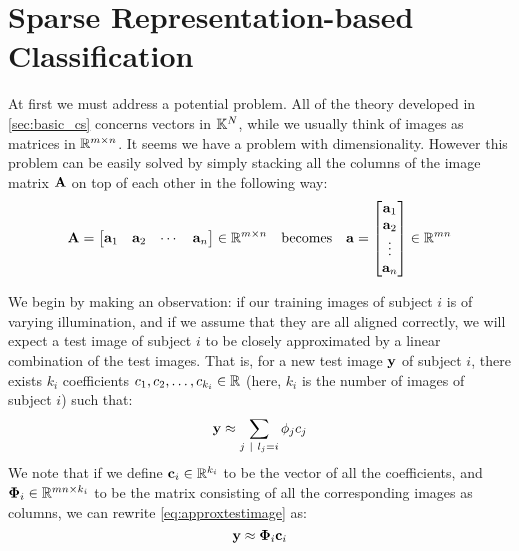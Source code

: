 \section{Sparse Representation-based Classification} \label{sec:src}
At first we must address a potential problem. All of the theory developed in \cref{sec:basic_cs} concerns vectors in $ \mathbb{K}^{N} $, while we usually think of images as matrices in $ \mathbb{R}^{m\times n} $. It seems we have a problem with dimensionality. However this problem can be easily solved by simply stacking all the columns of the image matrix $ \mathbf{A} $ on top of each other in the following way:
\[
	\mathbf{A} = \begin{bmatrix}
		\mathbf{a}_{1} & \mathbf{a}_{2} & \cdots & \mathbf{a}_{n}
	\end{bmatrix} \in \mathbb{R}^{m\times n}
	\quad\text{becomes}\quad 
	\mathbf{a} = \begin{bmatrix}
		\mathbf{a}_{1} \\
		\mathbf{a}_{2} \\
		\vdots \\
		\mathbf{a}_{n}
	\end{bmatrix} \in \mathbb{R}^{mn}
\]

We begin by making an observation: if our training images of subject $ i $ is of varying illumination, and if we assume that they are all aligned correctly, we will expect a test image of subject $ i $ to be closely approximated by a linear combination of the test images. That is, for a new test image $ \mathbf{y} $ of subject $ i $, there exists $ k_{i} $ coefficients $ c_{1}, c_{2}, \ldots, c_{k_{i}}  \in \mathbb{R} $ (here, $ k_{i} $ is the number of images of subject $ i $) such that:
\begin{equation}
	\label{eq:approxtestimage}
	\mathbf{y} \approx \sum_{j ~|~ l_{j} = i} \phi_{j}c_{j}
\end{equation}We note that if we define $ \mathbf{c}_{i} \in \mathbb{R}^{k_{i}} $ to be the vector of all the coefficients, and $ \mathbf{\Phi}_{i} \in \mathbb{R}^{mn \times k_{i}} $ to be the matrix consisting of all the corresponding images as columns, we can rewrite \eqref{eq:approxtestimage} as:
\begin{equation}
	\label{eq:approxtestimagematrix}
	\mathbf{y} \approx \mathbf{\Phi}_{i}\mathbf{c}_{i}
\end{equation}

